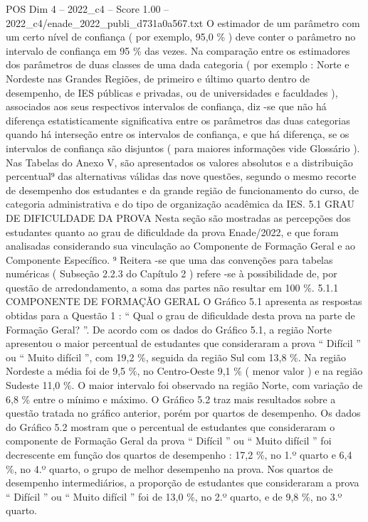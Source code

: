 \begin{textsample}{POS Dim 4 – 2022\_c4 – Score 1.00 – 2022\_c4/enade\_2022\_publi\_d731a0a567.txt}
O estimador de um parâmetro com um certo nível de confiança ( por exemplo, 95,0 \% ) deve conter o parâmetro no intervalo de confiança em 95 \% das vezes.
Na comparação entre os estimadores dos parâmetros de duas classes de uma dada categoria ( por exemplo : Norte e Nordeste nas Grandes Regiões, de primeiro e último quarto dentro de desempenho, de IES públicas e privadas, ou de universidades e faculdades ), associados aos seus respectivos intervalos de confiança, diz -se que não há diferença estatisticamente significativa entre os parâmetros das duas categorias quando há interseção entre os intervalos de confiança, e que há diferença, se os intervalos de confiança são disjuntos ( para maiores informações vide Glossário ).
Nas Tabelas do Anexo V, são apresentados os valores absolutos e a distribuição percentual⁹ das alternativas válidas das nove questões, segundo o mesmo recorte de desempenho dos estudantes e da grande região de funcionamento do curso, de categoria administrativa e do tipo de organização acadêmica da IES. 5.1 GRAU DE DIFICULDADE DA PROVA Nesta seção são mostradas as percepções dos estudantes quanto ao grau de dificuldade da prova Enade/2022, e que foram analisadas considerando sua vinculação ao Componente de Formação Geral e ao Componente Específico. ⁹ Reitera -se que uma das convenções para tabelas numéricas ( Subseção 2.2.3 do Capítulo 2 ) refere -se à possibilidade de, por questão de arredondamento, a soma das partes não resultar em 100 \%. 5.1.1 COMPONENTE DE FORMAÇÃO GERAL O Gráfico 5.1 apresenta as respostas obtidas para a Questão 1 : “ Qual o grau de dificuldade desta prova na parte de Formação Geral? ”.
De acordo com os dados do Gráfico 5.1, a região Norte apresentou o maior percentual de estudantes que consideraram a prova “ Difícil ” ou “ Muito difícil ”, com 19,2 \%, seguida da região Sul com 13,8 \%.
Na região Nordeste a média foi de 9,5 \%, no Centro-Oeste 9,1 \% ( menor valor ) e na região Sudeste 11,0 \%.
O maior intervalo foi observado na região Norte, com variação de 6,8 \% entre o mínimo e máximo.
O Gráfico 5.2 traz mais resultados sobre a questão tratada no gráfico anterior, porém por quartos de desempenho.
Os dados do Gráfico 5.2 mostram que o percentual de estudantes que consideraram o componente de Formação Geral da prova “ Difícil ” ou “ Muito difícil ” foi decrescente em função dos quartos de desempenho : 17,2 \%, no 1.º quarto e 6,4 \%, no 4.º quarto, o grupo de melhor desempenho na prova.
Nos quartos de desempenho intermediários, a proporção de estudantes que consideraram a prova “ Difícil ” ou “ Muito difícil ” foi de 13,0 \%, no 2.º quarto, e de 9,8 \%, no 3.º quarto.

\end{textsample}
